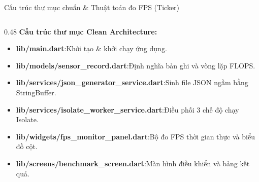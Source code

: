 \documentclass[aspectratio=169, 10pt]{beamer}
\begin{document}
\begin{frame}{Cấu trúc thư mục chuẩn \& Thuật toán đo FPS (Ticker)}
  \vspace{-0.2cm}
  \begin{columns}[t]
    \begin{column}{0.48\textwidth}
      \textbf{Cấu trúc thư mục Clean Architecture:}\\[0.15cm]
      \footnotesize
      \begin{itemize}
        \setlength{\itemsep}{3.5pt}
        \item \textbf{lib/main.dart}:\newline Khởi tạo \& khởi chạy ứng dụng.
        \item \textbf{lib/models/sensor\_record.dart}:\newline Định nghĩa bản ghi và vòng lặp FLOPS.
        \item \textbf{lib/services/json\_generator\_service.dart}:\newline Sinh file JSON ngầm bằng StringBuffer.
        \item \textbf{lib/services/isolate\_worker\_service.dart}:\newline Điều phối 3 chế độ chạy Isolate.
        \item \textbf{lib/widgets/fps\_monitor\_panel.dart}:\newline Bộ đo FPS thời gian thực và biểu đồ cột.
        \item \textbf{lib/screens/benchmark\_screen.dart}:\newline Màn hình điều khiển và bảng kết quả.
      \end{itemize}
    \end{column}


\end{columns}
\end{frame}
\end{document}
